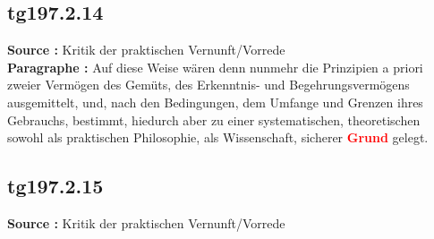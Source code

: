 \documentclass[a4paper,12pt,twoside]{book}
\newcommand{\match}[1]{\textcolor{red}{\textbf{#1}}}
\begin{document}
	\subsection*{tg197.2.14} 
	\textbf{Source : }Kritik der praktischen Vernunft/Vorrede\\  
	
	\noindent\textbf{Paragraphe : }Auf diese Weise wären denn nunmehr die Prinzipien a priori zweier Vermögen des Gemüts, des Erkenntnis- und Begehrungsvermögens ausgemittelt, und, nach den Bedingungen, dem Umfange und Grenzen ihres Gebrauchs, bestimmt, hiedurch aber zu einer systematischen, theoretischen sowohl als praktischen Philosophie, als Wissenschaft, sicherer \match{Grund} gelegt. 
	
	\subsection*{tg197.2.15} 
	\textbf{Source : }Kritik der praktischen Vernunft/Vorrede\\  
	
\end{document}
